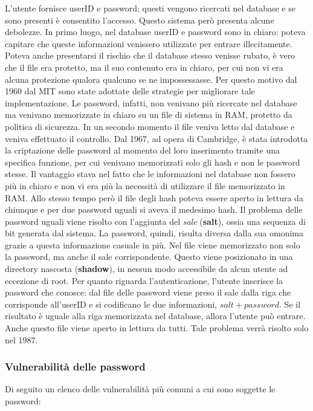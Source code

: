 L’utente fornisce userID e password; questi vengono ricercati nel database e se
sono presenti è consentito l’accesso.
Questo sistema però presenta alcune debolezze. In primo luogo, nel database
userID e password sono in chiaro: poteva capitare che queste informazioni
venissero utilizzate per entrare illecitamente. Poteva anche presentarsi il
rischio che il database stesso venisse rubato, è vero che il file era protetto,
ma il suo contenuto era in chiaro, per cui non vi era alcuna protezione qualora
qualcuno se ne impossessasse. Per questo motivo dal 1960 dal MIT sono state
adottate delle strategie per migliorare tale implementazione. Le password,
infatti, non venivano più ricercate nel database ma venivano memorizzate in
chiaro su un file di sistema in RAM, protetto da politica di sicurezza.
In un secondo momento il file veniva letto dal database e veniva effettuato
il controllo.
Dal 1967, ad opera di Cambridge, è stata introdotta la criptazione delle password
al momento del loro inserimento tramite una specifica funzione, per cui venivano
memorizzati solo gli hash e non le password stesse.
Il vantaggio stava nel fatto che le informazioni nel database non fossero più in
chiaro e non vi era più la necessità di utilizzare il file memorizzato in RAM.
Allo stesso tempo però il file degli hash poteva essere aperto in lettura da
chiunque e per due password uguali si aveva il medesimo hash.
Il problema delle password uguali viene risolto con l’aggiunta del \textit{sale}
(\textbf{salt}), ossia una sequenza di bit generata dal sistema. La password,
quindi, risulta diversa dalla sua omonima grazie a questa informazione casuale
in più.
Nel file viene memorizzato non solo la password, ma anche il sale corrispondente.
Questo viene posizionato in una directory nascosta (\textbf{shadow}), in nessun
modo accessibile da alcun utente ad eccezione di root.
Per quanto riguarda l’autenticazione, l’utente inserisce la password che conosce:
dal file delle password viene preso il sale dalla riga che corrisponde all’userID
e si codificano le due informazioni, \(salt + password\). Se il risultato è
uguale alla riga memorizzata nel database, allora l’utente può entrare.
Anche questo file viene aperto in lettura da tutti.
Tale problema verrà risolto solo nel 1987.

\subsubsection{Vulnerabilità delle password}
Di seguito un elenco delle vulnerabilità più comuni a cui sono soggette le
password:


